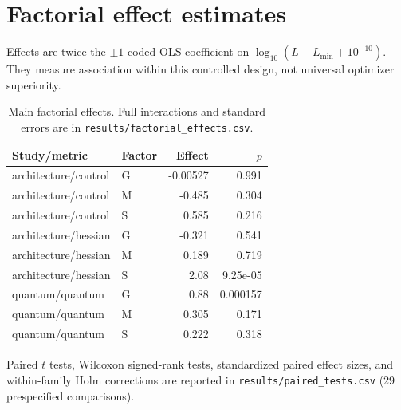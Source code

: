 \documentclass[10pt]{article}
\begin{document}
\section{Factorial effect estimates}
Effects are twice the $\pm1$-coded OLS coefficient on
$\log_{10}(L-L_{\min}+10^{-10})$.  They measure association within this
controlled design, not universal optimizer superiority.
\begin{table}[ht]\centering\small
\begin{tabular}{llrr}\toprule
Study/metric & Factor & Effect & $p$ \\\midrule
architecture/control & G & -0.00527 & 0.991 \\
architecture/control & M & -0.485 & 0.304 \\
architecture/control & S & 0.585 & 0.216 \\
architecture/hessian & G & -0.321 & 0.541 \\
architecture/hessian & M & 0.189 & 0.719 \\
architecture/hessian & S & 2.08 & 9.25e-05 \\
quantum/quantum & G & 0.88 & 0.000157 \\
quantum/quantum & M & 0.305 & 0.171 \\
quantum/quantum & S & 0.222 & 0.318 \\
\bottomrule\end{tabular}
\caption{Main factorial effects. Full interactions and standard errors are in \texttt{results/factorial\_effects.csv}.}
\end{table}
Paired $t$ tests, Wilcoxon signed-rank tests, standardized paired effect sizes,
and within-family Holm corrections are reported in
\texttt{results/paired\_tests.csv} (29 prespecified comparisons).
\end{document}
